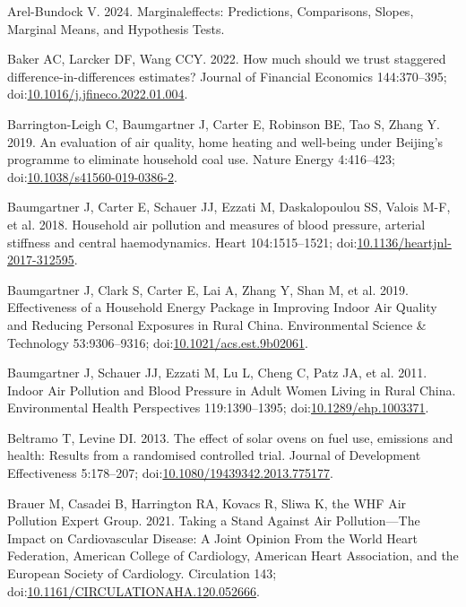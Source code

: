 \documentclass[
  letterpaper,
  DIV=11,
  numbers=noendperiod]{scrartcl}
\newlength{\cslhangindent}
\newlength{\cslentryspacingunit} %
\newenvironment{CSLReferences}[2] %
 {%
  \setlength{\parindent}{0pt}
  \ifodd #1
  \let\oldpar\par
  \def\par{\hangindent=\cslhangindent\oldpar}
  \fi
  \setlength{\parskip}{#2\cslentryspacingunit}
 }%
 {}
\begin{document}
\begin{CSLReferences}{1}{0}
\leavevmode{}%
Arel-Bundock V. 2024. Marginaleffects: {Predictions}, {Comparisons},
{Slopes}, {Marginal Means}, and {Hypothesis Tests}.

\leavevmode{}%
Baker AC, Larcker DF, Wang CCY. 2022. How much should we trust staggered
difference-in-differences estimates? Journal of Financial Economics
144:370--395;
doi:\href{https://doi.org/10.1016/j.jfineco.2022.01.004}{10.1016/j.jfineco.2022.01.004}.

\leavevmode{}%
Barrington-Leigh C, Baumgartner J, Carter E, Robinson BE, Tao S, Zhang
Y. 2019. An evaluation of air quality, home heating and well-being under
{Beijing}'s programme to eliminate household coal use. Nature Energy
4:416--423;
doi:\href{https://doi.org/10.1038/s41560-019-0386-2}{10.1038/s41560-019-0386-2}.

\leavevmode{}%
Baumgartner J, Carter E, Schauer JJ, Ezzati M, Daskalopoulou SS, Valois
M-F, et al. 2018. Household air pollution and measures of blood
pressure, arterial stiffness and central haemodynamics. Heart
104:1515--1521;
doi:\href{https://doi.org/10.1136/heartjnl-2017-312595}{10.1136/heartjnl-2017-312595}.

\leavevmode{}%
Baumgartner J, Clark S, Carter E, Lai A, Zhang Y, Shan M, et al. 2019.
Effectiveness of a {Household Energy Package} in {Improving Indoor Air
Quality} and {Reducing Personal Exposures} in {Rural China}.
Environmental Science \& Technology 53:9306--9316;
doi:\href{https://doi.org/10.1021/acs.est.9b02061}{10.1021/acs.est.9b02061}.

\leavevmode{}%
Baumgartner J, Schauer JJ, Ezzati M, Lu L, Cheng C, Patz JA, et al.
2011. Indoor {Air Pollution} and {Blood Pressure} in {Adult Women
Living} in {Rural China}. Environmental Health Perspectives
119:1390--1395;
doi:\href{https://doi.org/10.1289/ehp.1003371}{10.1289/ehp.1003371}.

\leavevmode{}%
Beltramo T, Levine DI. 2013. The effect of solar ovens on fuel use,
emissions and health: Results from a randomised controlled trial.
Journal of Development Effectiveness 5:178--207;
doi:\href{https://doi.org/10.1080/19439342.2013.775177}{10.1080/19439342.2013.775177}.

\leavevmode{}%
Brauer M, Casadei B, Harrington RA, Kovacs R, Sliwa K, the WHF Air
Pollution Expert Group. 2021. Taking a {Stand Against Air
Pollution}---{The Impact} on {Cardiovascular Disease}: {A Joint Opinion
From} the {World Heart Federation}, {American College} of {Cardiology},
{American Heart Association}, and the {European Society} of
{Cardiology}. Circulation 143;
doi:\href{https://doi.org/10.1161/CIRCULATIONAHA.120.052666}{10.1161/CIRCULATIONAHA.120.052666}.


\end{CSLReferences}
\end{document}
